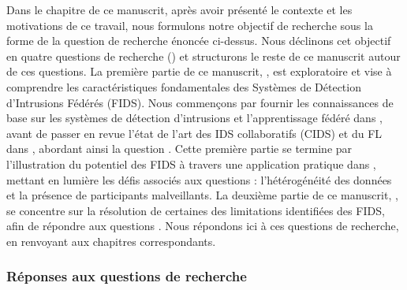 Dans le chapitre  de ce manuscrit, après avoir présenté le contexte et les motivations de ce travail, nous formulons notre objectif de recherche sous la forme de la question de recherche énoncée ci-dessus.
Nous déclinons cet objectif en quatre questions de recherche () et structurons le reste de ce manuscrit autour de ces questions.  
La première partie de ce manuscrit, , est exploratoire et vise à comprendre les caractéristiques fondamentales des Systèmes de Détection d'Intrusions Fédérés (FIDS).  
Nous commençons par fournir les connaissances de base sur les systèmes de détection d'intrusions et l'apprentissage fédéré dans , avant de passer en revue l'état de l'art des IDS collaboratifs (CIDS) et du FL dans , abordant ainsi la question .  
Cette première partie se termine par l'illustration du potentiel des FIDS à travers une application pratique dans , mettant en lumière les défis associés aux questions  : l'hétérogénéité des données et la présence de participants malveillants.  
La deuxième partie de ce manuscrit, , se concentre sur la résolution de certaines des limitations identifiées des FIDS, afin de répondre aux questions .  
Nous répondons ici à ces questions de recherche, en renvoyant aux chapitres correspondants.


\subsubsection{Réponses aux questions de recherche\label{sec:conclusion.contribs.answers}}

